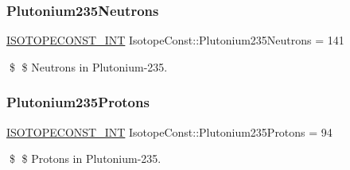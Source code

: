 \subsubsection{\texorpdfstring{Plutonium235\+Neutrons}{Plutonium235Neutrons}}
{\footnotesize\ttfamily \mbox{\hyperlink{group___isotope_const-_macros_ga5f18360b3e99483a35c32d789e62621c}{I\+S\+O\+T\+O\+P\+E\+C\+O\+N\+S\+T\+\_\+\+I\+NT}} Isotope\+Const\+::\+Plutonium235\+Neutrons = 141}

\$ \$ Neutrons in Plutonium-\/235. \mbox{\label{group___isotope_const-_plutonium-_pu235_ga52cda6cbd7c9e946f2c9b98ba47cf61a}} 
\subsubsection{\texorpdfstring{Plutonium235\+Protons}{Plutonium235Protons}}
{\footnotesize\ttfamily \mbox{\hyperlink{group___isotope_const-_macros_ga5f18360b3e99483a35c32d789e62621c}{I\+S\+O\+T\+O\+P\+E\+C\+O\+N\+S\+T\+\_\+\+I\+NT}} Isotope\+Const\+::\+Plutonium235\+Protons = 94}

\$ \$ Protons in Plutonium-\/235. 